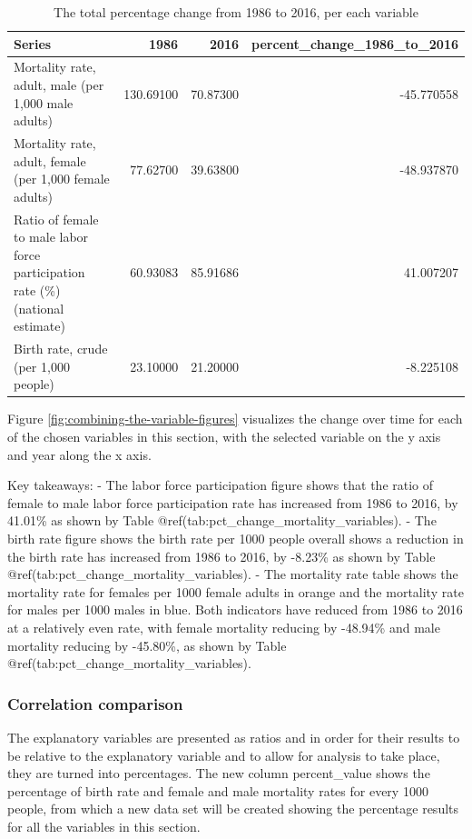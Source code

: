 \documentclass[11pt,a4paper,]{article}
\begin{document}
\begin{table}[!h]

\caption{\label{tab:percent-change-over-the-observed-time-period}The total percentage change from 1986 to 2016, per each variable}
\centering
\begin{tabular}[t]{l|r|r|r}
\hline
Series & 1986 & 2016 & percent\_change\_1986\_to\_2016\\
\hline
Mortality rate, adult, male (per 1,000 male adults) & 130.69100 & 70.87300 & -45.770558\\
\hline
Mortality rate, adult, female (per 1,000 female adults) & 77.62700 & 39.63800 & -48.937870\\
\hline
Ratio of female to male labor force participation rate (\%) (national estimate) & 60.93083 & 85.91686 & 41.007207\\
\hline
Birth rate, crude (per 1,000 people) & 23.10000 & 21.20000 & -8.225108\\
\hline
\end{tabular}
\end{table}

Figure \ref{fig:combining-the-variable-figures} visualizes the change
over time for each of the chosen variables in this section, with the
selected variable on the y axis and year along the x axis.

Key takeaways: - The labor force participation figure shows that the
ratio of female to male labor force participation rate has increased
from 1986 to 2016, by 41.01\% as shown by Table
@ref(tab:pct\_change\_mortality\_variables). - The birth rate figure
shows the birth rate per 1000 people overall shows a reduction in the
birth rate has increased from 1986 to 2016, by -8.23\% as shown by Table
@ref(tab:pct\_change\_mortality\_variables). - The mortality rate table
shows the mortality rate for females per 1000 female adults in orange
and the mortality rate for males per 1000 males in blue. Both indicators
have reduced from 1986 to 2016 at a relatively even rate, with female
mortality reducing by -48.94\% and male mortality reducing by -45.80\%,
as shown by Table @ref(tab:pct\_change\_mortality\_variables).

\subsubsection{Correlation comparison}\label{correlation-comparison}

The explanatory variables are presented as ratios and in order for their
results to be relative to the explanatory variable and to allow for
analysis to take place, they are turned into percentages. The new column
percent\_value shows the percentage of birth rate and female and male
mortality rates for every 1000 people, from which a new data set will be
created showing the percentage results for all the variables in this
section.
\end{document}
